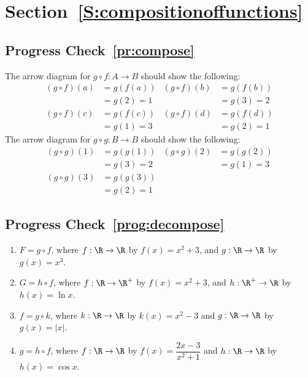 \section*{Section~\ref{S:compositionoffunctions}}

\subsection*{Progress Check~\ref{pr:compose}}
The arrow diagram for $g \circ f: A \to B$ should show the following:
\begin{align*}
(g \circ f)(a) &= g(f(a)) &  (g \circ f)(b) &= g(f(b))  \\
               &= g(2) = 1 &                &= g(3) = 2 \\
(g \circ f)(c) &= g(f(c)) &  (g \circ f)(d) &= g(f(d))  \\
               &= g(1) = 3 &                &= g(2) = 1
\end{align*}
The arrow diagram for $g \circ g: B \to B$ should show the following:
\begin{align*}
(g \circ g)(1) &= g(g(1)) &  (g \circ g)(2) &= g(g(2))   \\
               &= g(3) = 2 &                &= g(1) = 3  \\
(g \circ g)(3) &= g(g(3))   \\
               &= g(2) = 1 
\end{align*}




\subsection*{Progress Check~\ref{prog:decompose}}
\begin{enumerate}
\item $F = g \circ f$,  where  
   $f:\R \to \R$  by  $f ( x ) = x^2 + 3$,  and  
          $g:\R \to \R$ by $g(x) = x^3$.

\item $G = h \circ f$,  where
    $f:\R \to \R^+$  by  $f( x ) = x^2 + 3$,  and  
         $h:\R^+ \to \R$  by  $h(x) = \ln x$.

\item $f = g \circ k$, where $k:\R \to \R$ by $k(x) = x^2 - 3$ and $g:\R \to \R$ by 
       $g(x) = |x|$.

\item $g = h \circ f$, where  $f:\R \to \R$ by $f(x) = \dfrac{2x-3}{x^2 + 1}$ and 
      $h:\R \to \R$ by $h(x) = \cos x$.
\end{enumerate}




